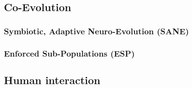     \subsection{Co-Evolution}
    \subsubsection{Symbiotic, Adaptive Neuro-Evolution (SANE)}
    \subsubsection{Enforced Sub-Populations (ESP)}
    
    \subsection{Human interaction}